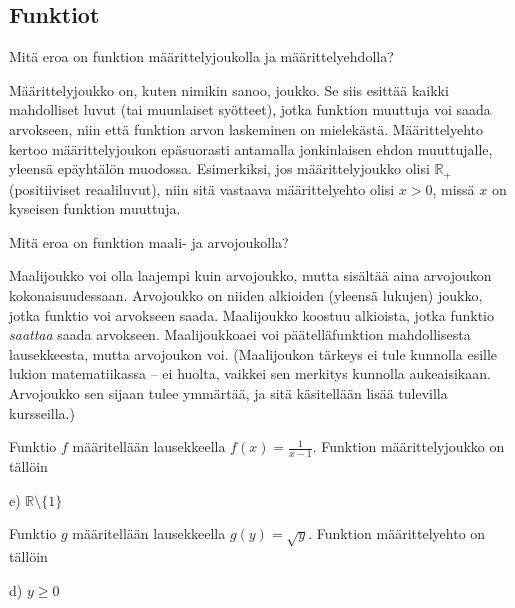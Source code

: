 \subsection*{Funktiot}

\begin{tehtava}
Mitä eroa on funktion määrittelyjoukolla ja määrittelyehdolla?
\begin{vastaus}
Määrittelyjoukko on, kuten nimikin sanoo, joukko. Se siis esittää kaikki mahdolliset luvut (tai muunlaiset syötteet), jotka funktion muuttuja voi saada arvokseen, niin että funktion arvon laskeminen on mielekästä. Määrittelyehto kertoo määrittelyjoukon epäsuorasti antamalla jonkinlaisen ehdon muuttujalle, yleensä epäyhtälön muodossa. Esimerkiksi, jos määrittelyjoukko olisi $\mathbb{R}_+$ (positiiviset reaaliluvut), niin sitä vastaava määrittelyehto olisi $x>0$, missä $x$ on kyseisen funktion muuttuja.
\end{vastaus}
\end{tehtava}

\begin{tehtava}
Mitä eroa on funktion maali- ja arvojoukolla?
	\begin{vastaus}
Maalijoukko voi olla laajempi kuin arvojoukko, mutta sisältää aina arvojoukon kokonaisuudessaan. Arvojoukko on niiden alkioiden (yleensä lukujen) joukko, jotka funktio voi arvokseen saada. Maalijoukko koostuu alkioista, jotka funktio \textit{saattaa} saada arvokseen. Maalijoukkoaei voi päätelläfunktion mahdollisesta lausekkeesta, mutta arvojoukon voi. (Maalijoukon tärkeys ei tule kunnolla esille lukion matematiikassa -- ei huolta, vaikkei sen merkitys kunnolla aukeaisikaan. Arvojoukko sen sijaan tulee ymmärtää, ja sitä käsitellään lisää tulevilla kursseilla.)
	\end{vastaus}
\end{tehtava}


\begin{tehtava}
Funktio $f$ määritellään lausekkeella $f(x)=\frac{1}{x-1}$. Funktion määrittelyjoukko on tällöin
    \begin{vastaus}
	 e) $\mathbb{R}\setminus \lbrace 1 \rbrace$
    \end{vastaus}
\end{tehtava}

\begin{tehtava}
Funktio $g$ määritellään lausekkeella $g(y)=\sqrt{y}$. Funktion määrittelyehto on tällöin
    \begin{vastaus}
	 d) $y\geq 0$
    \end{vastaus}
\end{tehtava}

\newpage